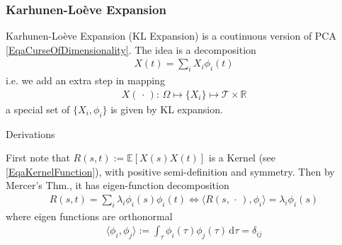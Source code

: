 





\subsubsection{Karhunen-Loève Expansion}

Karhunen-Loève Expansion (KL Expansion) is a coutinuous version of PCA \autoref{EqaCurseOfDimensionality}. The idea is a decomposition 
\begin{align}
    X(t)=\sum_{i}X_i\phi _i(t) 
\end{align}
i.e. we add an extra step in mapping
\begin{align}
    X(\, \cdot \, ):\, \Omega\mapsto \{X_i\}\mapsto \mathcal{T}\times \mathbb{R}  
\end{align}
a special set of $ \{X_i,\phi_i\} $ is given by KL expansion.

\begin{point}
    Derivations
\end{point}

First note that $ R(s,t):=\mathbb{E}\left[ X(s)X(t) \right] $ is a Kernel (see \autoref{EqaKernelFunction}), with positive semi-definition and symmetry. Then by Mercer's Thm., it has eigen-function decomposition
\begin{align}
    R(s,t) =\sum_{i} \lambda _i\phi _i(s)\phi _i(t) \Leftrightarrow \langle R(s,\, \cdot \, ),\phi_i\rangle = \lambda _i\phi_i(s)
\end{align}
where eigen functions are orthonormal
\begin{align}
    \langle \phi _i, \phi _j \rangle := \int_\tau \phi _i(\tau)\phi _j(\tau)\,\mathrm{d}\tau = \delta _{ij}
\end{align}

